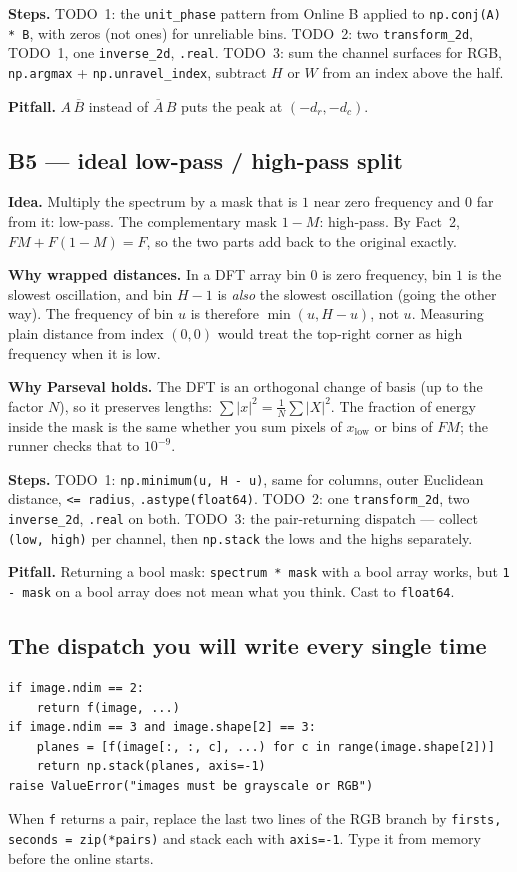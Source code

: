 \documentclass[11pt]{article}
\newcommand{\code}[1]{\texttt{#1}}
\begin{document}
\textbf{Steps.} TODO~1: the \code{unit\_phase} pattern from Online B applied to
\code{np.conj(A) * B}, with zeros (not ones) for unreliable bins. TODO~2: two
\code{transform\_2d}, TODO~1, one \code{inverse\_2d}, \code{.real}. TODO~3:
sum the channel surfaces for RGB, \code{np.argmax} + \code{np.unravel\_index},
subtract $H$ or $W$ from an index above the half.

\textbf{Pitfall.} $A\,\overline{B}$ instead of $\overline{A}\,B$ puts the peak
at $(-d_r, -d_c)$.

\subsection*{B5 --- ideal low-pass / high-pass split}

\textbf{Idea.} Multiply the spectrum by a mask that is $1$ near zero frequency
and $0$ far from it: low-pass. The complementary mask $1 - M$: high-pass. By
Fact~2, $F M + F (1 - M) = F$, so the two parts add back to the original
exactly.

\textbf{Why wrapped distances.} In a DFT array bin $0$ is zero frequency, bin
$1$ is the slowest oscillation, and bin $H-1$ is \emph{also} the slowest
oscillation (going the other way). The frequency of bin $u$ is therefore
$\min(u, H - u)$, not $u$. Measuring plain distance from index $(0,0)$ would
treat the top-right corner as high frequency when it is low.

\textbf{Why Parseval holds.} The DFT is an orthogonal change of basis (up to
the factor $N$), so it preserves lengths: $\sum |x|^2 = \frac{1}{N} \sum |X|^2$.
The fraction of energy inside the mask is the same whether you sum pixels of
$x_{\text{low}}$ or bins of $F M$; the runner checks that to $10^{-9}$.

\textbf{Steps.} TODO~1: \code{np.minimum(u, H - u)}, same for columns, outer
Euclidean distance, \code{<= radius}, \code{.astype(float64)}. TODO~2: one
\code{transform\_2d}, two \code{inverse\_2d}, \code{.real} on both. TODO~3:
the pair-returning dispatch --- collect \code{(low, high)} per channel, then
\code{np.stack} the lows and the highs separately.

\textbf{Pitfall.} Returning a bool mask: \code{spectrum * mask} with a bool
array works, but \code{1 - mask} on a bool array does not mean what you think.
Cast to \code{float64}.

\subsection*{The dispatch you will write every single time}

\begin{lstlisting}
if image.ndim == 2:
    return f(image, ...)
if image.ndim == 3 and image.shape[2] == 3:
    planes = [f(image[:, :, c], ...) for c in range(image.shape[2])]
    return np.stack(planes, axis=-1)
raise ValueError("images must be grayscale or RGB")
\end{lstlisting}
When \code{f} returns a pair, replace the last two lines of the RGB branch by
\code{firsts, seconds = zip(*pairs)} and stack each with \code{axis=-1}. Type it
from memory before the online starts.
\end{document}
